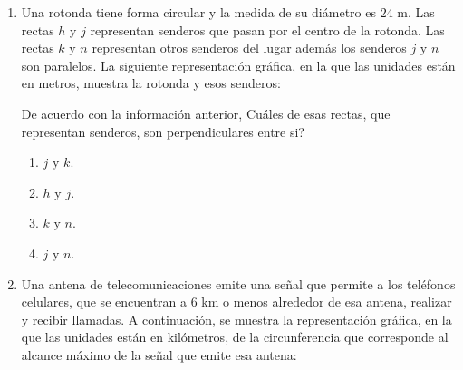 \documentclass[12pt]{article}
\newcommand{\puntografico}{0.35}
\begin{document}
\begin{enumerate}[label=\textbf{\arabic*.}, itemsep=2.5cm]
\Needspace{0.96\textheight}
\item
Una rotonda tiene forma circular y la medida de su di\'ametro es $24$ m. Las rectas $h$ y $j$ representan senderos que pasan por el centro de la rotonda. Las rectas $k$ y $n$ representan otros senderos del lugar adem\'as los senderos $j$ y $n$ son paralelos. La siguiente representaci\'on gr\'afica, en la que las unidades est\'an en metros, muestra la rotonda y esos senderos:

\begin{center}
\end{center}

De acuerdo con la informaci\'on anterior, \textquestiondown Cu\'ales de esas rectas, que representan senderos, son perpendiculares entre si?

\begin{enumerate}[label=\Alph*)]
  \item $j$ y $k$.
  \item $h$ y $j$.
  \item $k$ y $n$.
  \item $j$ y $n$.
\end{enumerate}

\Needspace{0.92\textheight}
\item
Una antena de telecomunicaciones emite una se\~nal que permite a los tel\'efonos celulares, que se encuentran a $6$ km o menos alrededor de esa antena, realizar y recibir llamadas. A continuaci\'on, se muestra la representaci\'on gr\'afica, en la que las unidades est\'an en kil\'ometros, de la circunferencia que corresponde al alcance m\'aximo de la se\~nal que emite esa antena:


\end{enumerate}
\end{document}
